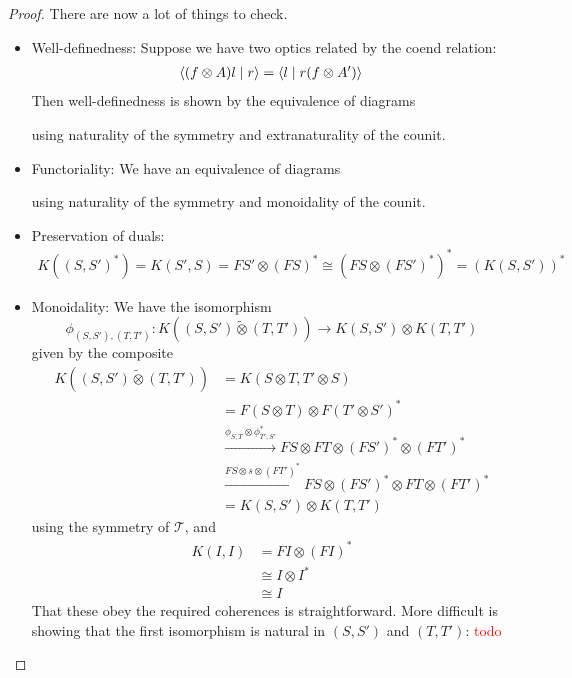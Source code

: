 \documentclass[11pt,letterpaper]{article}
\theoremstyle{plain}
\theoremstyle{definition}
\newcommand{\T}{\mathscr{T}}
\newcommand{\switched}{\mathbin{\tilde{\otimes}}}
\newcommand{\rep}[2]{{\ensuremath \left\langle #1 \mid #2 \right\rangle}}
\newcommand{\todo}[1]{\textcolor{red}{\small #1}}
\begin{document}
\begin{proof}
There are now a lot of things to check.
\begin{itemize}
\item Well-definedness: Suppose we have two optics related by the coend relation:
  \begin{align*}
    \rep{(f \otimes A) l}{r} = \rep{l}{r (f \otimes A')}
  \end{align*}
  Then well-definedness is shown by the equivalence of diagrams
  \begin{center}
    
    \qquad \raisebox{1.5cm}{$=$} \qquad
    
  \end{center}
  using naturality of the symmetry and extranaturality of the counit.
\item Functoriality: We have an equivalence of diagrams
  \begin{center}
    
    \quad \raisebox{1.5cm}{$=$} \quad
    
  \end{center}
using naturality of the symmetry and monoidality of the counit.
\item Preservation of duals:
\begin{align*}
K({(S, S')}^*)
= K(S', S)
= FS' \otimes {(FS)}^*
\cong {(FS \otimes {(FS')}^*)}^*
= {(K(S, S'))}^*
\end{align*}
\item Monoidality: We have the isomorphism \[ \phi_{(S, S'),(T, T')} : K((S, S') \switched (T, T')) \to K(S, S') \otimes K(T, T')\] given by the composite
\begin{align*}
K((S, S') \switched (T, T'))
&= K(S \otimes T, T' \otimes S) \\
&= F(S \otimes T) \otimes {F(T' \otimes S')}^* \\
&\xrightarrow{\phi_{S, T} \otimes \phi_{T', S'}^*} FS \otimes FT \otimes {(FS')}^* \otimes {(FT')}^* \\
&\xrightarrow{FS \otimes s \otimes (FT')^*} FS \otimes {(FS')}^* \otimes FT \otimes {(FT')}^* \\
&= K(S, S') \otimes K(T, T')
\end{align*}
using the symmetry of $\T$, and
\begin{align*}
K(I, I)
&= FI \otimes {(FI)}^* \\
&\cong I \otimes I^* \\
&\cong I
\end{align*}
That these obey the required coherences is straightforward. More difficult is showing that the first isomorphism is natural in $(S, S')$ and $(T, T')$: \todo{todo}

\end{itemize}
\end{proof}
\end{document}
